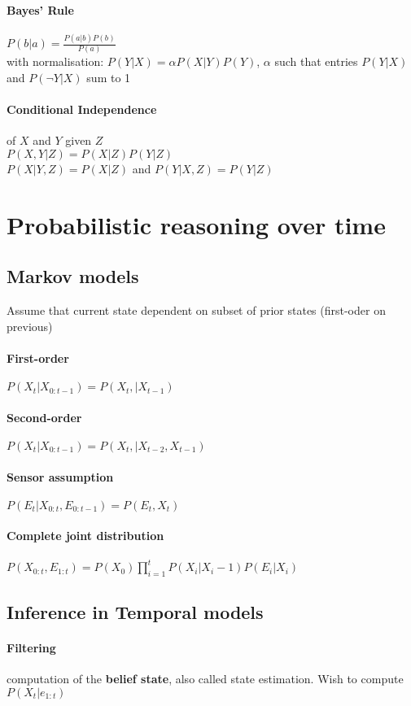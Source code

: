 \begin{multicols}{4}
\paragraph{Bayes' Rule} $P(b|a) = \frac{P(a|b)P(b)}{P(a)}$ \\
with normalisation: $P(Y|X) = \alpha P(X|Y)P(Y)$, $\alpha$ such that entries $P(Y|X)$ and $P(\lnot Y|X)$ sum to 1

\paragraph{Conditional Independence} of $X$ and $Y$ given $Z$\\
$P(X,Y|Z) = P(X|Z) P(Y|Z)$\\
$P(X|Y,Z) = P(X|Z)$ and $P(Y|X,Z) = P(Y|Z)$

\section{Probabilistic reasoning over time}

\subsection{Markov models}
Assume that current state dependent on subset of prior states (first-oder on previous)
\paragraph{First-order} $P(X_t|X_{0:t-1}) = P(X_t,|X_{t-1})$
\paragraph{Second-order} $P(X_t|X_{0:t-1}) = P(X_t,|X_{t-2},X_{t-1})$
\paragraph{Sensor assumption} $P(E_t|X_{0:t},E_{0:t-1}) = P(E_t, X_t)$
\paragraph{Complete joint distribution}
$P(X_{0:t},E_{1:t}) = P(X_0) \prod\limits_{i=1}^t P(X_i|X_i-1)P(E_i|X_i)$
\subsection{Inference in Temporal models}
\paragraph{Filtering} computation of the \textbf{belief state}, also called state estimation. Wish to compute $P(X_t|e_{1:t})$

\end{multicols}
